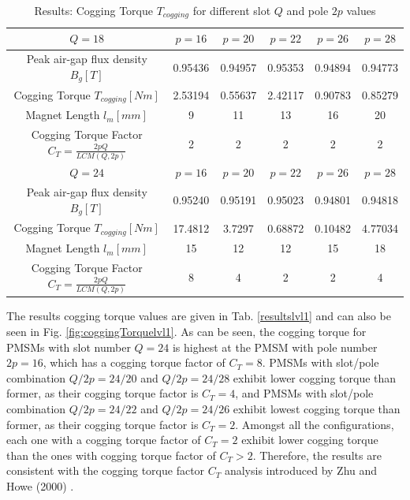\documentclass [a4 paper, 11pt, titlepage] {article}
\begin{document}
	\begin{table}[h]
		\begin{center}
			\begin{tabular}{c|c|c|c|c|c}
				$Q=18$ & $p=16$ & $p=20$ & $p=22$ & $p=26$ & $p=28$ \\
				\hline
				Peak air-gap flux density $B_g [T]$ & 0.95436 & 0.94957 & 0.95353 & 0.94894 & 0.94773 \\
				Cogging Torque $T_{cogging} [Nm]$ & 2.53194 & 0.55637 & 2.42117 & 0.90783 & 0.85279\\
				Magnet Length $l_m [mm]$ & 9 & 11 & 13 & 16 & 20 \\
				Cogging Torque Factor $C_T=\frac{2pQ}{LCM(Q,2p)}$ & 2 & 2 & 2 & 2 & 2 \\
				\hline\hline
				$Q=24$ & $p=16$ & $p=20$ & $p=22$ & $p=26$ & $p=28$ \\
				\hline
				Peak air-gap flux density $B_g [T]$ & 0.95240 & 0.95191 & 0.95023 & 0.94801 & 0.94818 \\
				Cogging Torque $T_{cogging} [Nm]$ & 17.4812 & 3.7297 & 0.68872 & 0.10482 & 4.77034 \\
				Magnet Length $l_m [mm]$ & 15 & 12 & 12 & 15 & 18 \\
				Cogging Torque Factor $C_T=\frac{2pQ}{LCM(Q,2p)}$ & 8 & 4 & 2 & 2 & 4 \\
			\end{tabular}
		\end{center}
		\caption{Results: Cogging Torque $T_{cogging}$ for different slot $Q$ and pole $2p$ values}
		\label{tab:resultslvl1}
	\end{table}
	
	The results cogging torque values are given in Tab. \ref{resultslvl1} and can also be seen in Fig. \ref{fig:coggingTorquelvl1}. As can be seen, the cogging torque for PMSMs with slot number $Q=24$ is highest at the PMSM with pole number $2p=16$, which has a cogging torque factor of $C_T=8$. PMSMs with slot/pole combination $Q/2p=24/20$ and $Q/2p=24/28$ exhibit lower cogging torque than former, as their cogging torque factor is $C_T=4$, and PMSMs with slot/pole combination $Q/2p=24/22$ and $Q/2p=24/26$ exhibit lowest cogging torque than former, as their cogging torque factor is $C_T=2$. Amongst all the configurations, each one with a cogging torque factor of $C_T=2$ exhibit lower cogging torque than the ones with cogging torque factor of $C_T>2$. Therefore, the results are consistent with the cogging torque factor $C_T$ analysis introduced by Zhu and Howe (2000) \cite{zhu_influence_2000}.
	
\end{document}
